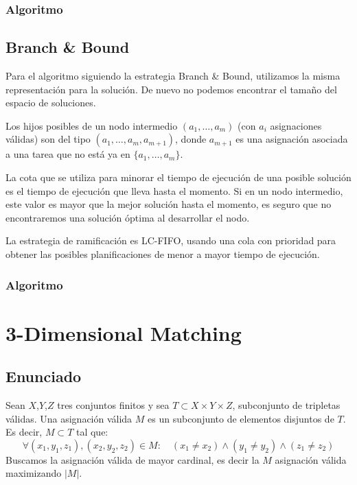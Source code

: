 \documentclass[a4paper, 11pt]{article} %
\begin{document}
    \subsubsection{Algoritmo}
    
      \small
      \texttt{}
      \normalsize
    
    \subsection{Branch \& Bound}
      Para el algoritmo siguiendo la estrategia Branch \& Bound, utilizamos la misma representación para la 
      solución. De nuevo no podemos encontrar el tamaño del espacio de soluciones. 
      
      Los hijos posibles de un nodo intermedio $(a_1, \dots, a_m)$ (con $a_i$ asignaciones válidas) son del tipo 
      $(a_1, \dots, a_m, a_{m+1})$, donde $a_{m+1}$ es una asignación asociada a una tarea que no está ya en 
      $\{a_1, \dots, a_m\}$.
      
      La cota que se utiliza para minorar el tiempo de ejecución de una posible solución es el tiempo de ejecución 
      que lleva hasta el momento. Si en un nodo intermedio, este valor es mayor que la mejor solución hasta el 
      momento, es seguro que no encontraremos una solución óptima al desarrollar el nodo.
      
      La estrategia de ramificación es LC-FIFO, usando una cola con prioridad para obtener las posibles 
      planificaciones de menor a mayor tiempo de ejecución.
    
      \subsubsection{Algoritmo}
      
        \small
        \texttt{}
        \normalsize
      
    \section{3-Dimensional Matching}
    \subsection{Enunciado}
    Sean $X$,$Y$,$Z$ tres conjuntos finitos y sea $T \subset X \times Y \times Z$, subconjunto de tripletas válidas.
    Una asignación válida $M$ es un subconjunto de elementos disjuntos de $T$. Es decir, $M \subset T$ tal que:
    \begin{equation}
        \forall (x_1,y_1,z_1), (x_2,y_2,z_2) \in M : \quad (x_1 \neq x_2) \wedge (y_1 \neq y_2) \wedge (z_1 \neq z_2)
        \end{equation} 
        Buscamos la asignación válida de mayor cardinal, es decir la $M$ asignación válida maximizando $|M|$.
        
\end{document}
